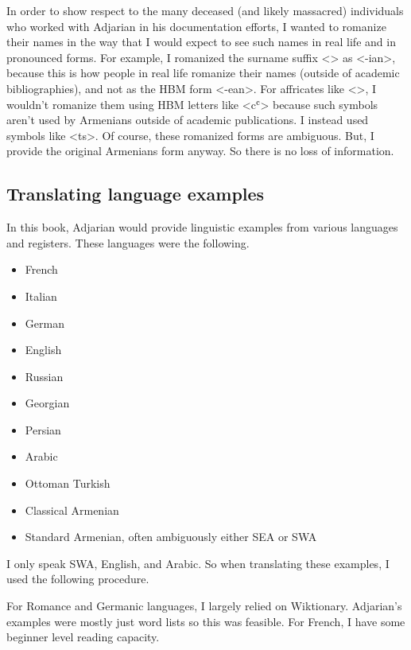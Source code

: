 In order  to show respect to the many deceased (and likely massacred) individuals who worked with Adjarian in his documentation efforts, I wanted to romanize their names in the way that I would expect to see such names in real life and in pronounced forms.  For example, I romanized the surname suffix <> as <-ian>, because this is how people in real life romanize their names (outside of academic bibliographies), and not as the HBM form <-ean>. For affricates like <>, I wouldn't romanize them using HBM letters like <cʿ> because such symbols aren't used by Armenians outside of academic publications. I instead used symbols like <ts>. Of course, these romanized forms are ambiguous. But, I provide the original Armenians form anyway. So there is no loss of information.






\subsection{Translating language examples}\label{sec:HossepIntro:translation:lang}

In this book, Adjarian would provide linguistic examples from various languages and registers. These languages were the following.

\begin{itemize}
		 \item French
\item Italian
\item German
\item English
		 \item Russian
		 \item Georgian
		 \item Persian
\item Arabic
		 \item Ottoman Turkish
		 \item Classical Armenian
		 \item Standard Armenian, often ambiguously either SEA or SWA
		\end{itemize}
		

I only speak SWA, English, and Arabic. So when translating these examples, I used the following procedure. 

For Romance and Germanic languages, I largely relied on Wiktionary. Adjarian's examples were mostly just word lists so this was feasible. For French, I have some beginner level reading capacity. 

